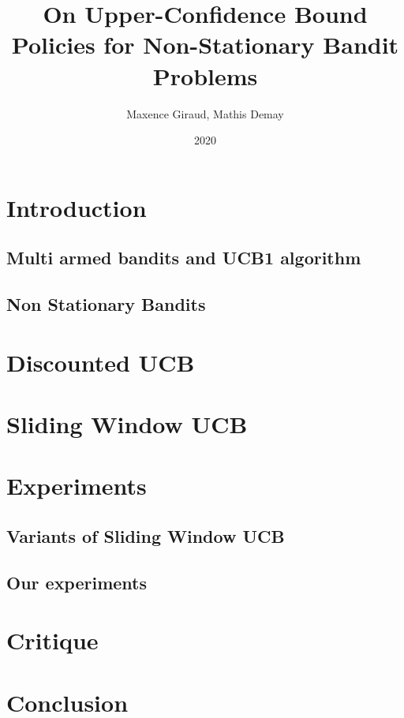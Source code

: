 \documentclass{article}
\title{On Upper-Confidence Bound Policies for Non-Stationary Bandit Problems}
\author{Maxence Giraud, Mathis Demay}
\date{2020}
\begin{document}
\maketitle

\begin{abstract}

	
	
\end{abstract}

\section{Introduction}

	\subsection{Multi armed bandits and UCB1 algorithm}

		

	\subsection{Non Stationary Bandits}

		

\section{Discounted UCB}
	

\section{Sliding Window UCB}

	

\section{Experiments} \label{sec_expes}
	
	\subsection{Variants of Sliding Window UCB}
	
		

	\subsection{Our experiments}

		

\section{Critique}
	
	

\section{Conclusion}

	


\end{document}
